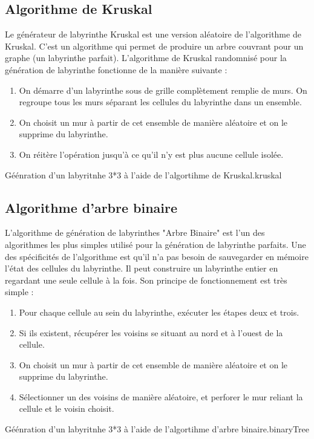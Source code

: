 \subsection{Algorithme de Kruskal}
Le générateur de labyrinthe Kruskal est une version aléatoire de l'algorithme de Kruskal. C'est un algorithme qui permet de produire un arbre couvrant pour un graphe (un labyrinthe parfait).
L'algorithme de Kruskal randomnisé pour la génération de labyrinthe fonctionne de la manière suivante :
\newline
\begin{enumerate}
    \item On démarre d'un labyrinthe sous de grille complètement remplie de murs. On regroupe tous les murs séparant les cellules du labyrinthe dans un ensemble.
    \item On choisit un mur à partir de cet ensemble de manière aléatoire et on le supprime du labyrinthe.
    \item On réitère l'opération jusqu'à ce qu'il n'y est plus aucune cellule isolée.
\end{enumerate}
{Géénration d'un labyritnhe 3*3 à l'aide de l'algortihme de Kruskal.}{kruskal}


\subsection{Algorithme d'arbre binaire}
L'algorithme de génération de labyrinthes "Arbre Binaire" est l'un des algorithmes les plus simples utilisé pour la génération de labyrinthe parfaits. Une des spécificités de l'algorithme est qu'il n'a pas besoin de sauvegarder en mémoire l'état des cellules du labyrinthe. Il peut construire un labyrinthe entier en regardant une seule cellule à la fois.
Son principe de fonctionnement est très simple :
\newpage
\begin{enumerate}
    \item Pour chaque cellule au sein du labyrinthe, exécuter les étapes deux et trois.
    \item Si ils existent, récupérer les voisins se situant au nord et à l'ouest de la cellule.
    \item On choisit un mur à partir de cet ensemble de manière aléatoire et on le supprime du labyrinthe.
    \item Sélectionner un des voisins de manière aléatoire, et perforer le mur reliant la cellule et le voisin choisit.
\end{enumerate}
\newline
{}
{Géénration d'un labyritnhe 3*3 à l'aide de l'algortihme d'arbre binaire.}{binaryTree}



